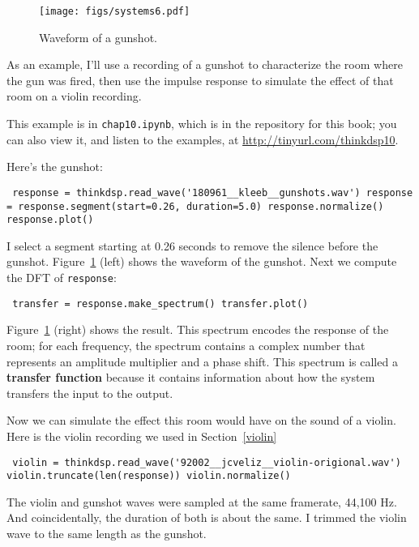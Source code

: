 \documentclass[12pt]{book} \usepackage[width=5.5in,height=8.5in, hmarginratio=3:2,vmarginratio=1:1]{geometry}
\begin{document}
\begin{figure} 

\centerline{\texttt{[image: figs/systems6.pdf]}} \caption{Waveform of a gunshot.} \label{fig.systems6} \end{figure} 

As an example, I'll use a recording of a gunshot to characterize the room where the gun was fired, then use the impulse response to simulate the effect of that room on a violin recording. 

This example is in {\tt chap10.ipynb}, which is in the repository for this book; you can also view it, and listen to the examples, at \url{http://tinyurl.com/thinkdsp10}. 

Here's the gunshot: 

\begin{verbatim} response = thinkdsp.read_wave('180961__kleeb__gunshots.wav') response = response.segment(start=0.26, duration=5.0) response.normalize() response.plot() \end{verbatim} 

I select a segment starting at 0.26 seconds to remove the silence before the gunshot. Figure~\ref{fig.systems6} (left) shows the waveform of the gunshot. Next we compute the DFT of {\tt response}: 

\begin{verbatim} transfer = response.make_spectrum() transfer.plot() \end{verbatim} 

Figure~\ref{fig.systems6} (right) shows the result. This spectrum encodes the response of the room; for each frequency, the spectrum contains a complex number that represents an amplitude multiplier and a phase shift. This spectrum is called a {\bf transfer function} because it contains information about how the system transfers the input to the output. 

Now we can simulate the effect this room would have on the sound of a violin. Here is the violin recording we used in Section~\ref{violin} 

\begin{verbatim} violin = thinkdsp.read_wave('92002__jcveliz__violin-origional.wav') violin.truncate(len(response)) violin.normalize() \end{verbatim} 

The violin and gunshot waves were sampled at the same framerate, 44,100 Hz. And coincidentally, the duration of both is about the same. I trimmed the violin wave to the same length as the gunshot. 
\end{document}
